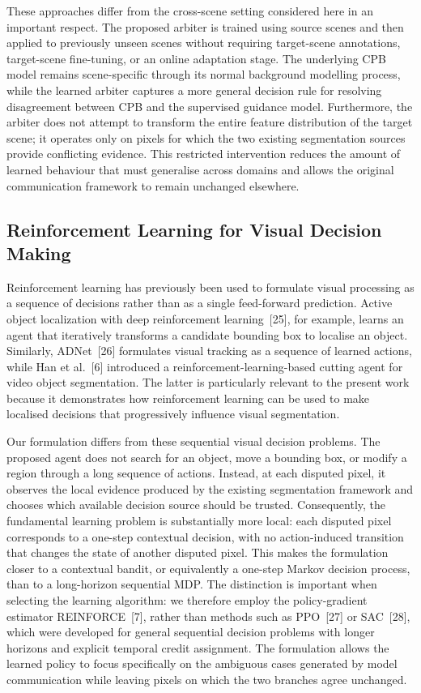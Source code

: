 \documentclass[sn-basic]{sn-jnl}
\begin{document}
These approaches differ from the cross-scene setting considered here in an important
respect. The proposed arbiter is trained using source scenes and then applied to
previously unseen scenes without requiring target-scene annotations, target-scene
fine-tuning, or an online adaptation stage. The underlying CPB model remains
scene-specific through its normal background modelling process, while the learned
arbiter captures a more general decision rule for resolving disagreement between CPB
and the supervised guidance model. Furthermore, the arbiter does not attempt to
transform the entire feature distribution of the target scene; it operates only on
pixels for which the two existing segmentation sources provide conflicting evidence.
This restricted intervention reduces the amount of learned behaviour that must
generalise across domains and allows the original communication framework to remain
unchanged elsewhere.

\subsection{Reinforcement Learning for Visual Decision Making}
Reinforcement learning has previously been used to formulate visual processing as a
sequence of decisions rather than as a single feed-forward prediction. Active object
localization with deep reinforcement learning~[25], for example, learns an agent
that iteratively transforms a candidate bounding box to localise an object.
Similarly, ADNet~[26] formulates visual tracking as a sequence of learned actions,
while Han et al.~[6] introduced a reinforcement-learning-based cutting agent for
video object segmentation. The latter is particularly relevant to the present work
because it demonstrates how reinforcement learning can be used to make localised
decisions that progressively influence visual segmentation.

Our formulation differs from these sequential visual decision problems. The proposed
agent does not search for an object, move a bounding box, or modify a region through
a long sequence of actions. Instead, at each disputed pixel, it observes the local
evidence produced by the existing segmentation framework and chooses which available
decision source should be trusted. Consequently, the fundamental learning problem is
substantially more local: each disputed pixel corresponds to a one-step contextual
decision, with no action-induced transition that changes the state of another
disputed pixel. This makes the formulation closer to a contextual bandit, or
equivalently a one-step Markov decision process, than to a long-horizon
sequential MDP. The distinction is important when selecting the learning algorithm:
we therefore employ the policy-gradient estimator REINFORCE~[7], rather than methods
such as PPO~[27] or SAC~[28], which were developed for general sequential decision
problems with longer horizons and explicit temporal credit assignment. The
formulation allows the learned policy to focus specifically on the ambiguous cases
generated by model communication while leaving pixels on which the two branches
agree unchanged.
\end{document}
